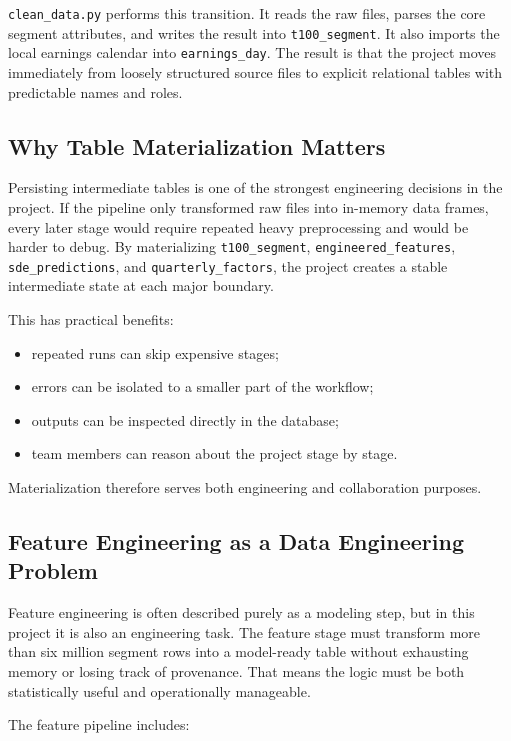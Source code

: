 \documentclass[11pt,a4paper]{article}
\begin{document}
\texttt{clean\_data.py} performs this transition. It reads the raw files,
parses the core segment attributes, and writes the result into
\texttt{t100\_segment}. It also imports the local earnings calendar into
\texttt{earnings\_day}. The result is that the project moves immediately from
loosely structured source files to explicit relational tables with predictable
names and roles.

\subsection{Why Table Materialization Matters}

Persisting intermediate tables is one of the strongest engineering decisions in
the project. If the pipeline only transformed raw files into in-memory data
frames, every later stage would require repeated heavy preprocessing and would
be harder to debug. By materializing \texttt{t100\_segment},
\texttt{engineered\_features}, \texttt{sde\_predictions}, and
\texttt{quarterly\_factors}, the project creates a stable intermediate state at
each major boundary.

This has practical benefits:

\begin{itemize}[leftmargin=*]
  \item repeated runs can skip expensive stages;
  \item errors can be isolated to a smaller part of the workflow;
  \item outputs can be inspected directly in the database;
  \item team members can reason about the project stage by stage.
\end{itemize}

Materialization therefore serves both engineering and collaboration purposes.

\subsection{Feature Engineering as a Data Engineering Problem}

Feature engineering is often described purely as a modeling step, but in this
project it is also an engineering task. The feature stage must transform more
than six million segment rows into a model-ready table without exhausting
memory or losing track of provenance. That means the logic must be both
statistically useful and operationally manageable.

The feature pipeline includes:
\end{document}
